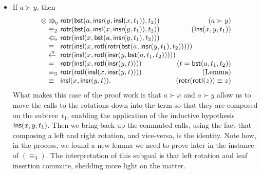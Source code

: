 \begin{itemize}
\begin{itemize}
    \item If \(a \succ y\), then 
      \begin{equation*}
      \begin{array}{@{}r@{\;}l@{\;}l@{\hspace{-8mm}}r@{}}
        \otimes & \Rra{\eta} &
        \fun{rotr}(\fun{bst}(a,\fun{insr}(y,\fun{insl}(x,t_1)),t_2))
        & (a \succ y)\\
        & \equiv_2 & \fun{rotr}(\fun{bst}(a,\fun{insl}(x,  
        \fun{insr}(y,t_1)),t_2)) & (\pred{Ins}{x,y,t_1})\\
        & \Lla{\tau} & \fun{rotr}(\fun{insl}(x,
        \fun{bst}(a,\fun{insr}(y,t_1),t_2)))\\
        & \equiv & \fun{rotr}(\fun{insl}(x,
        \fun{rotl}(\fun{rotr}(\fun{bst}(a,\fun{insr}(y,t_1),t_2)))))\\
        & \xleftarrow{\smash{\eta}} &
        \fun{rotr}(\fun{insl}(x,\fun{rotl}(\fun{insr}(y, 
        \fun{bst}(a,t_1,t_2)))))\\
        & = & \fun{rotr}(\fun{insl}(x,\fun{rotl}(\fun{insr}(y,t))))
        & (t=\fun{bst}(a,t_1,t_2))\\
        & \equiv_3 & \fun{rotr}(\fun{rotl}(\fun{insl}(x, 
        \fun{insr}(y,t)))) & (\text{Lemma})\\
        & \equiv & \fun{insl}(x,\fun{insr}(y,t)).
        & (\fun{rotr}(\fun{rotl}(z)) \equiv z)
      \end{array}
      \end{equation*}
      What makes this case of the proof work is that \(a \succ x\) and
      \(a \succ y\) allow us to move the calls to the rotations down
      into the term so that they are composed on the subtree~\(t_1\),
      enabling the application of the inductive hypothesis
      \(\textsf{Ins}({x,y,t_1})\). Then we bring back up the commuted
      calls, using the fact that composing a left and right rotation,
      and vice\hyp{}versa, is the identity. Note how, in the process,
      we found a new lemma we need to prove later in the instance of
      \((\equiv_3)\). The interpretation of this subgoal is that left
      rotation and leaf insertion commute, shedding more light on the
      matter.


\end{itemize}
\end{itemize}
